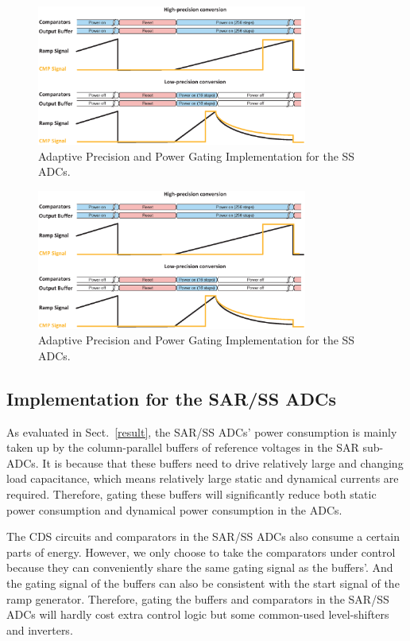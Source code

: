 \begin{figure}[htbp]
	\centerline{\includegraphics[width=3.5in]{./Figures/SS_pg.eps}}
	\caption{Adaptive Precision and Power Gating Implementation for the SS ADCs.}
	\label{SS_pg}
\end{figure} 

\begin{figure}[htbp]
	\centerline{\includegraphics[width=3.5in]{./Figures/SS_pg.eps}}
	\caption{Adaptive Precision and Power Gating Implementation for the SS ADCs.}
	\label{SS_pg}
\end{figure} 

\subsection{Implementation for the SAR/SS ADCs}

As evaluated in Sect.~\ref{result}, the SAR/SS ADCs’ power consumption is mainly taken up by the column-parallel buffers of reference voltages in the SAR sub-ADCs.
It is because that these buffers need to drive relatively large and changing load capacitance, which means relatively large static and dynamical currents are required.
Therefore, gating these buffers will significantly reduce both static power consumption and dynamical power consumption in the ADCs.

The CDS circuits and comparators in the SAR/SS ADCs also consume a certain parts of energy. However, we only choose to take the comparators under control because they can conveniently share the same gating signal as the buffers'. And the gating signal of the buffers can also be consistent with the start signal of the ramp generator. Therefore, gating the buffers and comparators in the SAR/SS ADCs will hardly cost extra control logic but some common-used level-shifters and inverters.

